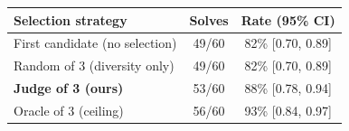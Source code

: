 \begin{tabular}{lcc}
\toprule
Selection strategy & Solves & Rate (95\% CI) \\
\midrule
First candidate (no selection) & 49/60 & 82\% [0.70, 0.89] \\
Random of 3 (diversity only) & 49/60 & 82\% [0.70, 0.89] \\
\textbf{Judge of 3 (ours)} & 53/60 & 88\% [0.78, 0.94] \\
Oracle of 3 (ceiling) & 56/60 & 93\% [0.84, 0.97] \\
\bottomrule
\end{tabular}
